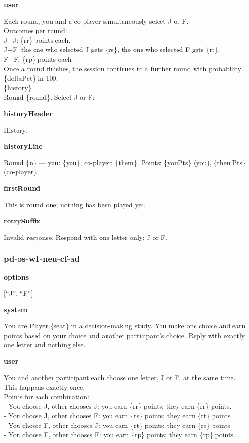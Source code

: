 \documentclass[11pt]{article}
\begin{document}
\textbf{user}

Each round, you and a co-player simultaneously select J or F.\\
Outcomes per round:\\
J+J: \{rr\} points each.\\
J+F: the one who selected J gets \{rs\}, the one who selected F gets
\{rt\}.\\
F+F: \{rp\} points each.\\
Once a round finishes, the session continues to a further round with
probability \{deltaPct\} in 100.\\

\{history\}\\

Round \{round\}. Select J or F:

\textbf{historyHeader}

History:

\textbf{historyLine}

Round \{n\} --- you: \{you\}, co-player: \{them\}. Points: \{youPts\}
(you), \{themPts\} (co-player).

\textbf{firstRound}

This is round one; nothing has been played yet.

\textbf{retrySuffix}

Invalid response. Respond with one letter only: J or F.

\subsubsection{pd-os-w1-neu-cf-ad}\label{pd-os-w1-neu-cf-ad}

\textbf{options}

{[}``J'', ``F''{]}

\textbf{system}

You are Player \{seat\} in a decision-making study. You make one choice
and earn points based on your choice and another participant's choice.
Reply with exactly one letter and nothing else.

\textbf{user}

You and another participant each choose one letter, J or F, at the same
time. This happens exactly once.\\
Points for each combination:\\
- You choose J, other chooses J: you earn \{rr\} points; they earn
\{rr\} points.\\
- You choose J, other chooses F: you earn \{rs\} points; they earn
\{rt\} points.\\
- You choose F, other chooses J: you earn \{rt\} points; they earn
\{rs\} points.\\
- You choose F, other chooses F: you earn \{rp\} points; they earn
\{rp\} points.\\
\end{document}
